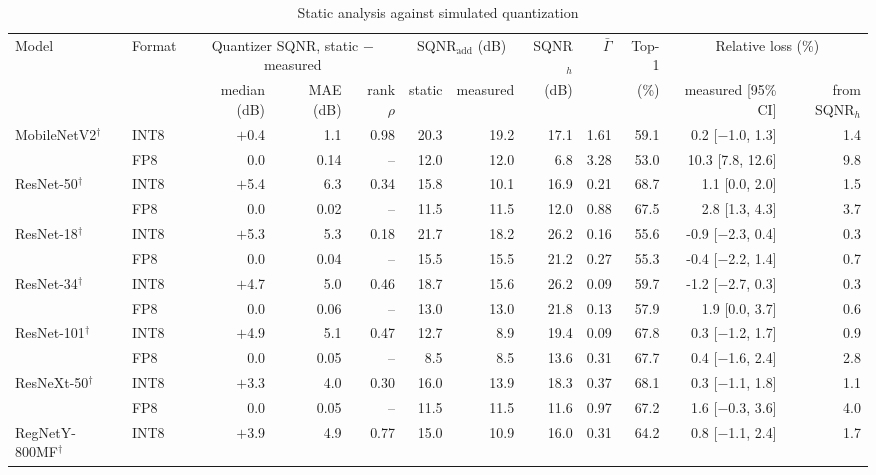 \documentclass[pdflatex,sn-mathphys-num]{sn-jnl}%
\theoremstyle{thmstyleone}%
\theoremstyle{thmstyletwo}%
\theoremstyle{thmstylethree}%
\begin{document}
\begin{appendices}
\begin{table}
\footnotesize\setlength{\tabcolsep}{4pt}
\caption{Static analysis against simulated quantization}\label{tab:staticval}
\begin{tabular}{@{}llrrrrrrrrrr@{}}
\toprule
Model & Format & \multicolumn{3}{c}{Quantizer SQNR, static $-$ measured} & \multicolumn{2}{c}{SQNR$_\text{add}$ (dB)} & SQNR$_h$ & $\bar\Gamma$ & Top-1 & \multicolumn{2}{c}{Relative loss (\%)} \\
\cmidrule{3-5}\cmidrule{6-7}\cmidrule{11-12}
 & & median (dB) & MAE (dB) & rank $\rho$ & static & measured & (dB) & & (\%) & measured [95\% CI] & from SQNR$_h$ \\
\midrule
MobileNetV2$^\dagger$ & INT8 & $+$0.4 & 1.1 & 0.98 & 20.3 & 19.2 & 17.1 & 1.61 & 59.1 & 0.2 [$-$1.0, 1.3] & 1.4 \\
 & FP8 & 0.0 & 0.14 & -- & 12.0 & 12.0 & 6.8 & 3.28 & 53.0 & 10.3 [7.8, 12.6] & 9.8 \\
\midrule
ResNet-50$^\dagger$ & INT8 & $+$5.4 & 6.3 & 0.34 & 15.8 & 10.1 & 16.9 & 0.21 & 68.7 & 1.1 [0.0, 2.0] & 1.5 \\
 & FP8 & 0.0 & 0.02 & -- & 11.5 & 11.5 & 12.0 & 0.88 & 67.5 & 2.8 [1.3, 4.3] & 3.7 \\
\midrule
ResNet-18$^\dagger$ & INT8 & $+$5.3 & 5.3 & 0.18 & 21.7 & 18.2 & 26.2 & 0.16 & 55.6 & -0.9 [$-$2.3, 0.4] & 0.3 \\
 & FP8 & 0.0 & 0.04 & -- & 15.5 & 15.5 & 21.2 & 0.27 & 55.3 & -0.4 [$-$2.2, 1.4] & 0.7 \\
\midrule
ResNet-34$^\dagger$ & INT8 & $+$4.7 & 5.0 & 0.46 & 18.7 & 15.6 & 26.2 & 0.09 & 59.7 & -1.2 [$-$2.7, 0.3] & 0.3 \\
 & FP8 & 0.0 & 0.06 & -- & 13.0 & 13.0 & 21.8 & 0.13 & 57.9 & 1.9 [0.0, 3.7] & 0.6 \\
\midrule
ResNet-101$^\dagger$ & INT8 & $+$4.9 & 5.1 & 0.47 & 12.7 & 8.9 & 19.4 & 0.09 & 67.8 & 0.3 [$-$1.2, 1.7] & 0.9 \\
 & FP8 & 0.0 & 0.05 & -- & 8.5 & 8.5 & 13.6 & 0.31 & 67.7 & 0.4 [$-$1.6, 2.4] & 2.8 \\
\midrule
ResNeXt-50$^\dagger$ & INT8 & $+$3.3 & 4.0 & 0.30 & 16.0 & 13.9 & 18.3 & 0.37 & 68.1 & 0.3 [$-$1.1, 1.8] & 1.1 \\
 & FP8 & 0.0 & 0.05 & -- & 11.5 & 11.5 & 11.6 & 0.97 & 67.2 & 1.6 [$-$0.3, 3.6] & 4.0 \\
\midrule
RegNetY-800MF$^\dagger$ & INT8 & $+$3.9 & 4.9 & 0.77 & 15.0 & 10.9 & 16.0 & 0.31 & 64.2 & 0.8 [$-$1.1, 2.4] & 1.7 \\

\end{tabular}
\end{table}
\end{appendices}
\end{document}
